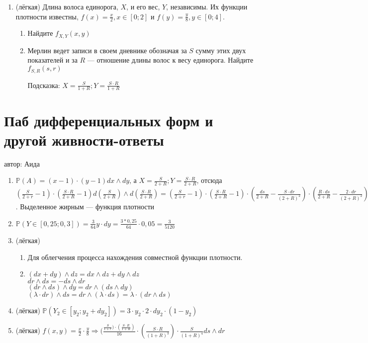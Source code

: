\documentclass[a4paper,12pt]{article}
\def \P{\mathbb{P}}
\begin{document}
\begin{enumerate}
В конце недели они составляют рейтинг результатов, $Y_i$ – это место в рейтинге по возрастанию,то есть $Y_1$ – это место рыцаря, которые проехал меньше всего. Найдите $\P(Y_2 \in [y_2;y_2+dy_2])$ с точностью до $o(\Delta)$.
\item (лёгкая) Длина волоса единорога, $X$, и его вес, $Y$, независимы. Их функции плотности известны, $f(x)=\frac{x}{2}, x \in [0;2]$ и $f(y)=\frac{y}{8}, y \in [0;4]$.

\begin{enumerate}
\item Найдите $f_{X,Y}(x,y)$
\item Мерлин ведет записи в своем дневнике обозначая за $S$ сумму этих двух показателей и за $R$ — отношение длины волос к весу единорога. Найдите $f_{S,R}(s,r)$

Подсказка: $X=\frac{S}{1+R}; Y=\frac{S\cdot R}{1+R}$
\end{enumerate}

\end{enumerate}

\newpage
\section{Паб дифференциальных форм и другой живности-ответы}
автор: Аида

\begin{enumerate}
\item $\P(A)=(x-1)\cdot(y-1)dx\wedge dy$, а $X=\frac{S}{2+R}; Y=\frac{S\cdot R}{2+R}$, отсюда  $(\frac{S}{2+r}-1)\cdot (\frac{S\cdot R}{2+R}-1) d(\frac{S}{2+R}) \wedge d(\frac{S\cdot R}{2+R})=(\frac{S}{2+r}-1)\cdot (\frac{S\cdot R}{2+R}-1)\cdot(\frac{ds}{2+R}-\frac{S\cdot dr}{(2+R)^2})\cdot (\frac{R\cdot ds}{2+R}-\frac{2\cdot dr}{(2+R)^2})= \mathbf{(\frac{S}{2+r}-1)\cdot (\frac{S\cdot R}{2+R}-1) \cdot (\frac{S\cdot R-2}{(2+R)^3})}\cdot ds\wedge dr$. Выделенное жирным — функция плотности
\item
$\P(Y \in [0,25;0,3])= \frac{3}{64}y \cdot dy = \frac{3*0,25}{64} \cdot 0,05= \frac{3}{5120}$

\item (лёгкая)
\begin{enumerate}
\item Для облегчения процесса нахождения совместной функции плотности.
\item $(dx+dy)\wedge dz=dx\wedge dz + dy\wedge dz$
\\ $dr\wedge ds= - ds\wedge dr $ \\ $(dr\wedge ds) \wedge dy =dr\wedge (ds \wedge dy)$ \\  $(\lambda \cdot dr) \wedge ds = dr \wedge (\lambda \cdot ds)= \lambda \cdot ( dr \wedge ds)$
\end{enumerate}
\item (лёгкая) $\P(Y_2 \in [y_2;y_2+dy_2])=3\cdot y_2 \cdot 2 \cdot dy_2 \cdot (1-y_2)$
\item (лёгкая) $f(x,y)=\frac{x}{2} \cdot \frac{y}{8}\Rightarrow (\frac{\frac{S}{1+r})\cdot (\frac{S\cdot R}{1+R})}{16} \cdot (\frac{S\cdot R}{(1+R)^3})\cdot \frac{S}{(1+R)^4} ds\wedge dr$
\end{enumerate}
\end{document}
